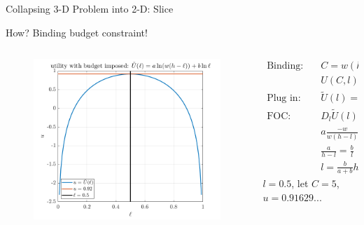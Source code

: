 \documentclass[11pt,aspectratio=43]{beamer}
\theoremstyle{definition}
\begin{document}
\begin{frame}{Collapsing 3-D Problem into 2-D: Slice}
\label{slide:Collapsing_3_D_Problem_into_2_D_Slice}
\begin{center}
    How? Binding budget constraint!
\end{center}
\begin{columns}
    \begin{column}{0.5\textwidth}
        \begin{figure}
            \includegraphics[width=\textwidth]{./figures/UtilityBudget2C.png}
        \end{figure}
    \end{column}
    \begin{column}{0.5\textwidth}
        \begin{align*}
            \text{Binding:} \quad
                & C = w ( h-l )
            \\
                & U( C, l ) = a \ln C + b \ln l
            \\
            \text{Plug in:} \quad
                & \tilde{U}( l ) = a \ln ( w( h-l ) ) + b \ln l
            \\
            \text{FOC:} \quad
                & D_{l}\tilde{U}( l ) = 0
            \\
                & a \frac{-w}{w( h-l )} + b \frac{1}{l} = 0
            \\
                & \frac{a}{h-l} = \frac{b}{l}
            \\
                & l = \frac{b}{a+b} h
        \end{align*}
        $ l = 0.5 $, let $ C =  5$, $ u = 0.91629... $
    \end{column}
\end{columns}
\end{frame}
\end{document}

